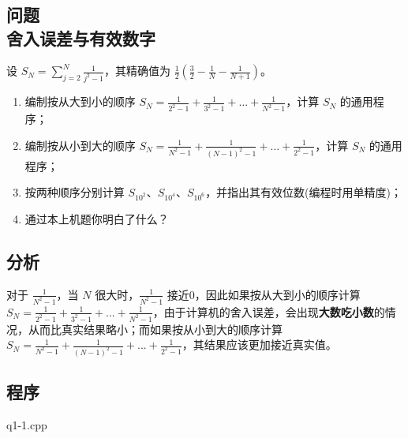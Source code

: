 \chapter[第一章]{} %
\label{cha:chapter1}

\section{问题 \\ 舍入误差与有效数字}

设 $S_N = \sum ^N _{j=2} \frac{1}{j^2-1}$，其精确值为 $\frac{1}{2}(\frac{3}{2}-\frac{1}{N}-\frac{1}{N+1})$。

\begin{enumerate}
    \item 编制按从大到小的顺序 $S_N = \frac{1}{2^2-1} + \frac{1}{3^2-1} + ... + \frac{1}{N^2-1}$，计算 $S_N$ 的通用程序；

    \item 编制按从小到大的顺序 $S_N = \frac{1}{N^2-1} + \frac{1}{(N-1)^2-1} + ... + \frac{1}{2^2-1}$，计算 $S_N$ 的通用程序；

    \item 按两种顺序分别计算 $S_{10^2}$、$S_{10^4}$、$S_{10^6}$，并指出其有效位数(编程时用单精度)；

    \item 通过本上机题你明白了什么？

\end{enumerate}

\section{分析}

对于 $\frac{1}{N^2-1}$，当 $N$ 很大时，$\frac{1}{N^2-1}$ 接近0，因此如果按从大到小的顺序计算 $S_N = \frac{1}{2^2-1} + \frac{1}{3^2-1} + ... + \frac{1}{N^2-1}$，由于计算机的舍入误差，会出现\textbf{大数吃小数}的情况，从而比真实结果略小；而如果按从小到大的顺序计算 $S_N = \frac{1}{N^2-1} + \frac{1}{(N-1)^2-1} + ... + \frac{1}{2^2-1}$，其结果应该更加接近真实值。

\section{程序}

q1-1.cpp

